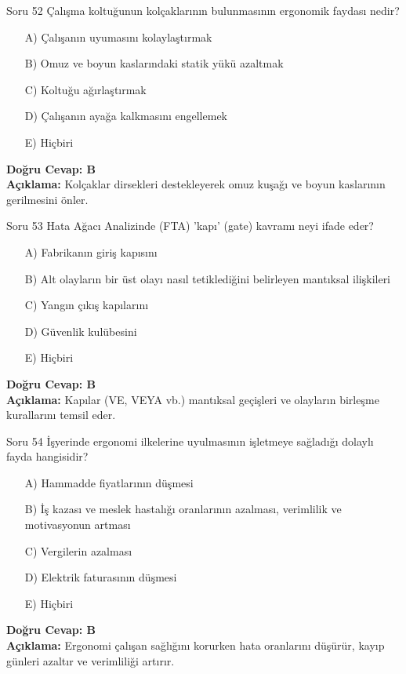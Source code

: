 \documentclass[12pt,a4paper]{article}
\begin{document}
\begin{testcard}{Soru 52}
    Çalışma koltuğunun kolçaklarının bulunmasının ergonomik faydası nedir?
    \begin{itemize}
        \item[A)] Çalışanın uyumasını kolaylaştırmak
        \item[B)] Omuz ve boyun kaslarındaki statik yükü azaltmak
        \item[C)] Koltuğu ağırlaştırmak
        \item[D)] Çalışanın ayağa kalkmasını engellemek
        \item[E)] Hiçbiri
    \end{itemize}
    \tcblower
    \textbf{Doğru Cevap: B} \\
    \textbf{Açıklama:} Kolçaklar dirsekleri destekleyerek omuz kuşağı ve boyun kaslarının gerilmesini önler.
\end{testcard}

\begin{testcard}{Soru 53}
    Hata Ağacı Analizinde (FTA) 'kapı' (gate) kavramı neyi ifade eder?
    \begin{itemize}
        \item[A)] Fabrikanın giriş kapısını
        \item[B)] Alt olayların bir üst olayı nasıl tetiklediğini belirleyen mantıksal ilişkileri
        \item[C)] Yangın çıkış kapılarını
        \item[D)] Güvenlik kulübesini
        \item[E)] Hiçbiri
    \end{itemize}
    \tcblower
    \textbf{Doğru Cevap: B} \\
    \textbf{Açıklama:} Kapılar (VE, VEYA vb.) mantıksal geçişleri ve olayların birleşme kurallarını temsil eder.
\end{testcard}

\begin{testcard}{Soru 54}
    İşyerinde ergonomi ilkelerine uyulmasının işletmeye sağladığı dolaylı fayda hangisidir?
    \begin{itemize}
        \item[A)] Hammadde fiyatlarının düşmesi
        \item[B)] İş kazası ve meslek hastalığı oranlarının azalması, verimlilik ve motivasyonun artması
        \item[C)] Vergilerin azalması
        \item[D)] Elektrik faturasının düşmesi
        \item[E)] Hiçbiri
    \end{itemize}
    \tcblower
    \textbf{Doğru Cevap: B} \\
    \textbf{Açıklama:} Ergonomi çalışan sağlığını korurken hata oranlarını düşürür, kayıp günleri azaltır ve verimliliği artırır.
\end{testcard}
\end{document}
